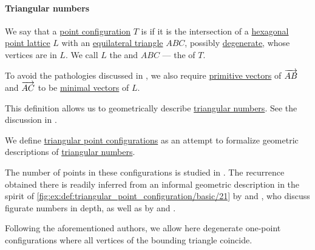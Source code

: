 \paragraph{Triangular numbers}

\begin{definition}\label{def:triangular_point_configuration}\mimprovised
  We say that a \hyperref[def:point_configuration]{point configuration} \( T \) is  if it is the intersection of a \hyperref[def:hexagonal_point_lattice]{hexagonal point lattice} \( L \) with an \hyperref[def:triangle/equilateral]{equilateral triangle} \( ABC \), possibly \hyperref[def:degenerate_polytope]{degenerate}, whose vertices are in \( L \). We call \( L \) the  and \( ABC \) --- the  of \( T \).

  To avoid the pathologies discussed in , we also require \hyperref[def:primitive_lattice_vector]{primitive vectors} of \( \overrightarrow{AB} \) and \( \overrightarrow{AC} \) to be \hyperref[def:minimal_lattice_vector]{minimal vectors} of \( L \).
\end{definition}
\begin{comments}
  \item This definition allows us to geometrically describe \hyperref[def:triangular_number]{triangular numbers}. See the discussion in .
\end{comments}

\begin{remark}\label{rem:triangular_point_configurations}
  We define \hyperref[def:triangular_point_configuration]{triangular point configurations} as an attempt to formalize geometric descriptions of \hyperref[def:triangular_number]{triangular numbers}.

  The number of points in these configurations is studied in . The recurrence obtained there is readily inferred from an informal geometric description in the spirit of \cref{fig:ex:def:triangular_point_configuration/basic/21} by  and , who discuss figurate numbers in depth, as well as by  and .

  Following the aforementioned authors, we allow here degenerate one-point configurations where all vertices of the bounding triangle coincide.
\end{remark}

